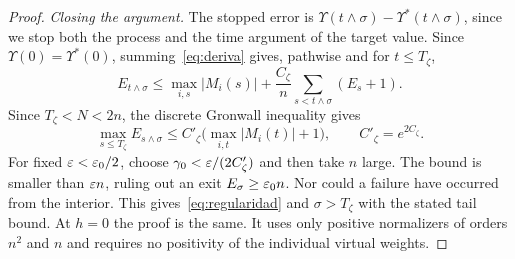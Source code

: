 \begin{proof}
\emph{Closing the argument.} The stopped error is $\Upsilon(t\wedge\sigma)-\Upsilon^*(t\wedge\sigma)$, since
we stop both the process
and the time argument of the target value. Since $\Upsilon(0)=\Upsilon^*(0)$, summing~\eqref{eq:deriva}
gives, pathwise and for
$t\le T_\zeta$, \[
 E_{t\wedge\sigma}\le\max_{i,s}|M_i(s)|+\frac{C_\zeta}n\sum_{s<t\wedge\sigma}(E_s+1).
\] Since $T_\zeta<N<2n$, the discrete Gronwall inequality gives \[
 \max_{s\le T_\zeta}E_{s\wedge\sigma}\le C'_\zeta\bigl(\max_{i,t}|M_i(t)|+1\bigr),\qquad
C'_\zeta=e^{2C_\zeta}.
\] For fixed $\varepsilon<\varepsilon_0/2$, choose $\gamma_0<\varepsilon/(2C'_\zeta)$ and then
take $n$ large. The bound is smaller than $\varepsilon n$, ruling out an exit $E_\sigma\ge\varepsilon_0n$. Nor could a
failure have occurred from the
interior. This gives~\eqref{eq:regularidad} and $\sigma>T_\zeta$ with the stated tail bound. At $h=0$ the
proof is the same. It uses
only positive normalizers of orders $n^2$ and $n$ and requires no positivity of the individual virtual
weights. \end{proof}
